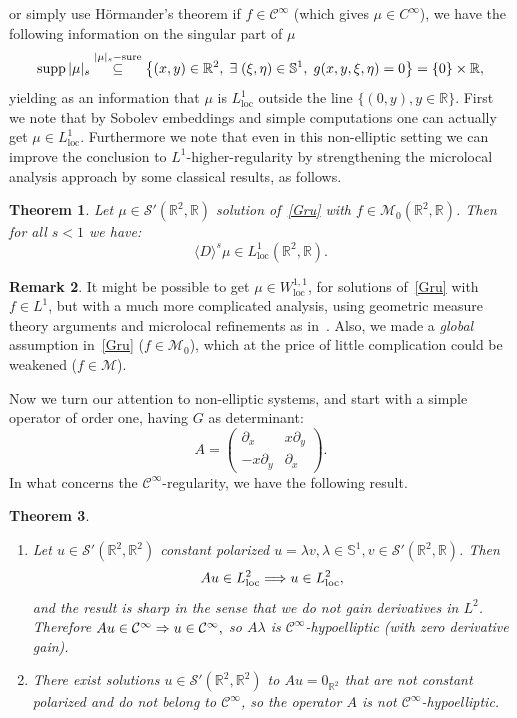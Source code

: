 \documentclass[10pt]{amsart}
\newtheorem{theo}{Theorem}[section]
\theoremstyle{definition}\newtheorem{defi}[theo]{Definition}\newtheorem{rema}[theo]{Remark}\newtheorem{exam}[theo]{Example}\newtheorem{exem}[theo]{Example}\newtheorem{nota}[theo]{Notation}
\DeclareMathOperator{\sure}{sure}
\DeclareMathOperator{\supp}{supp}
\DeclareMathOperator{\locc}{loc}
\newcommand{\bbR}{\mathbb{R}}
\newcommand{\bbS}{\mathbb{S}}
\newcommand{\clC}{\mathcal{C}}
\newcommand{\clS}{\mathcal{S}}
\newcommand{\clM}{\mathcal{M}}
\renewcommand*{\implies}{\mathchoice{\Longrightarrow}{\Rightarrow}{\Rightarrow}{\Rightarrow}}
\let\originalleft\left
\let\originalright\right
\renewcommand{\left}{\mathopen{}\mathclose\bgroup\originalleft}
\renewcommand{\right}{\aftergroup\egroup\originalright}
\newcommand*{\relabel}{\renewcommand{\labelenumi}{(\theenumi)}}
\newcommand*{\romanenumi}{\renewcommand*{\theenumi}{\roman{enumi}}\relabel}
\let\oldexists\exists
\renewcommand*{\exists}{\mathrel{\oldexists}}
\begin{document}
\pagebreak{}
or simply use H\"ormander's theorem if $f\in\clC^\infty$ (which gives $\mu\in C^\infty$), we have the following information on the singular part of $\mu$
\[
\supp |\mu|_s\overset{|\mu|_s-\sure}\subseteq 
\left\{(x,y)\in\bbR^2, \;\exists (\xi,\eta)\in\bbS^1, \; g(x,y,\xi,\eta)=0\right\}= \{0\}\times\bbR,
\]
yielding as an information that $\mu$ is $L^1_{\locc}$ outside the line $\{(0,y),y\in\bbR\}$. First we note that by Sobolev embeddings and simple computations one can actually get $ \mu\in L^1_{\locc}$. Furthermore we note that even in this non-elliptic setting we can improve the conclusion to $L^1$-higher-regularity by strengthening the microlocal analysis approach by some classical results, as follows.


\begin{theo}\label{th}
Let $\mu\in \clS'(\bbR^2,\bbR)$ solution of~\eqref{Gru} with $f\in\clM_0(\bbR^2,\bbR)$. Then for all $s<1$ we have:
\[
\langle D\rangle^{s}\mu\in L^1_{\locc}(\bbR^2,\bbR).
\]
\end{theo}

\begin{rema}
It might be possible to get $\mu\in W^{1,1}_{\locc}$, for solutions of~\eqref{Gru} with $f\in L^1$, but with a much more complicated analysis, using geometric measure theory arguments and microlocal refinements as in~\cite{BBWFL1}. Also, we made a \emph{global} assumption in~\eqref{Gru} ($f \in \clM_0$), which at the price of little complication could be weakened ($f\in \clM$).
\end{rema}

Now we turn our attention to non-elliptic systems, and start with a simple operator of order one, having $G$ as determinant:
\[
A=
\begin{pmatrix}
\partial_{x} & x\partial_{y}\\
-x\partial_{y} & \partial_{x}
\end{pmatrix}.
\]
In what concerns the $\clC^\infty$-regularity, we have the following result.

\begin{theo}\leavevmode
\label{thvectcinfty}
\begin{enumerate}\romanenumi
\item\label{theo1.3.1} Let $u\in \clS'(\bbR^2,\bbR^2)$ constant polarized $u=\lambda v,\lambda\in \bbS^1, v\in \clS'(\bbR^2,\bbR)$. Then
\[
Au\in L^2_{\locc} \implies u\in L^2_{\locc},
\]
and the result is sharp in the sense that we do not gain derivatives in $L^2$. Therefore $Au\in\clC^\infty \implies u\in\clC^\infty,$ so $A\lambda$ is $\clC^\infty$-hypoelliptic (with zero derivative gain).


\item\label{theo1.3.2} There exist solutions $u\in \clS'(\bbR^2,\bbR^2)$ to $Au=0_{\bbR^2}$ that are not constant polarized and do not belong to $\clC^\infty$, so the operator $A$ is not $\clC^\infty$-hypoelliptic.
\end{enumerate}
\end{theo}
\end{document}
